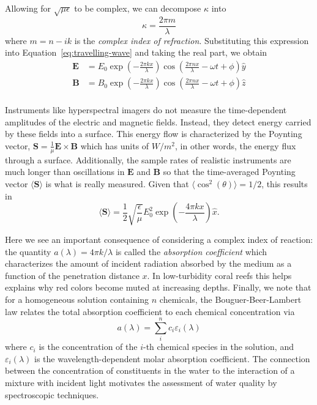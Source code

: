 Allowing for $\sqrt{\mu\epsilon}$ to be complex, we can decompose $\kappa$ into
\begin{equation}
  \kappa = \frac{2\pi m}{\lambda}
\end{equation}
where $m=n - ik$ is the \textit{complex index of refraction}. Substituting this expression
into Equation~\ref{eq:travelling-wave} and taking the real part, we obtain
\begin{equation}\label{eq:wave-real}
  \begin{aligned}
    \mathbf{E} &= E_0\exp\left(-\frac{2\pi k x}{\lambda}\right)\cos\left(  \frac{2\pi n x}{\lambda} - \omega t  + \phi \right) \hat{y} \\
    \mathbf{B} &= B_0\exp\left(-\frac{2\pi k x}{\lambda}\right)\cos\left(  \frac{2\pi n x}{\lambda} - \omega t  + \phi \right) \hat{z} \\
  \end{aligned}
\end{equation}

Instruments like hyperspectral imagers do not measure
the time-dependent amplitudes of the electric and magnetic fields. Instead, they
detect energy carried by these fields into a surface. This energy
flow is characterized by the Poynting vector, $\mathbf{S} =
\frac{1}{\mu}\mathbf{E}\times\mathbf{B}$ which has units of $W/m^2$, in other
words, the energy flux through a surface. Additionally, the sample rates of realistic
instruments are much longer than oscillations in $\mathbf{E}$ and $\mathbf{B}$ so
that the time-averaged Poynting vector $\langle
\mathbf{S} \rangle$ is what is really measured. Given that $\langle  \cos^2(\theta) \rangle =
1/2$, this results in
\begin{equation}
  \langle \mathbf{S} \rangle = \frac{1}{2}\sqrt{\frac{\epsilon}{\mu}}E_0^2\exp\left(-\frac{4\pi k x}{\lambda}\right) \hat{x}.
\end{equation}

Here we see an important consequence of considering a complex index of reaction:
the quantity $a(\lambda)=4\pi k/\lambda$ is called the \textit{absorption coefficient}
which characterizes the amount of incident radiation absorbed by the medium as a
function of the penetration distance $x$. In low-turbidity coral reefs this helps
explains why red colors become muted at increasing depths. Finally, we note that
for a homogeneous solution containing $n$ chemicals, the Bouguer-Beer-Lambert law
relates the total absorption coefficient to each chemical concentration via
\begin{equation}
  a(\lambda) = \sum_i^n c_i\varepsilon_i(\lambda)
\end{equation}
where $c_i$ is the concentration of the $i$-th chemical species in the solution,
and $\varepsilon_i(\lambda)$ is the wavelength-dependent molar absorption
coefficient. The connection between the concentration of constituents in the
water to the interaction of a mixture with incident light motivates the
assessment of water quality by spectroscopic techniques.

